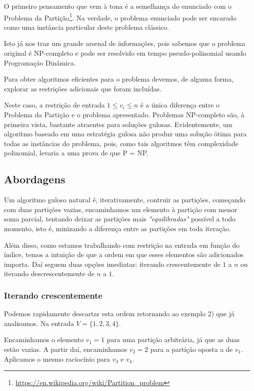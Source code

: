 O primeiro pensamento que vem à tona é a semelhança do enunciado com o Problema da Partição\footnote{\url{https://en.wikipedia.org/wiki/Partition_problem}}. Na verdade, o problema enunciado pode ser encarado como uma instância particular deste problema clássico.

Isto já nos traz um grande arsenal de informações, pois sabemos que o problema original é NP-completo e pode ser resolvido em tempo pseudo-polinomial usando Programação Dinâmica.

Para obter algoritmos eficientes para o problema devemos, de alguma forma, explorar as restrições adicionais que foram incluídas.

Neste caso, a restrição de entrada $1 \leq v_i \leq n$ é a única diferença entre o Problema da Partição e o problema apresentado. 
Problemas NP-completo são, à primeira vista, bastante atraentes para soluções gulosas. Evidentemente, um algoritmo baseado em uma estratégia gulosa não produz uma solução ótima para todas as instâncias do problema, pois, como tais algoritmos têm complexidade polinomial, levaria a uma prova de que P = NP.

\subsection*{Abordagens}\label{particao:abordagem}

Um algoritmo guloso natural é, iterativamente, contruir as partições, começando com duas partições vazias, encaminhamos um elemento à partição com menor soma parcial, tentando deixar as partições mais \emph{"equilibradas"} possível a todo momento, isto é, minizando a diferença entre as partições em toda iteração.

Além disso, como estamos trabalhando com restrição na entrada em função do índice, temos a intuição de que a ordem em que esses elementos são adicionados importa. Daí seguem duas opções imediatas: iterando crescentemente de $1$ a $n$ ou iterando descrescentemente de $n$ a $1$.

\subsubsection*{Iterando crescentemente}

Podemos rapidamente descartar esta ordem retornando ao exemplo 2) que já analisamos. Na entrada $V = \{1, 2, 3, 4\}$.

Encaminhamos o elemento $v_1 = 1$ para uma partição arbitrária, já que as duas estão vazias. A partir daí, encaminhamos $v_2 = 2$ para a partição oposta a de $v_1$. Aplicamos o mesmo raciocínio para $v_3$ e $v_4$.

